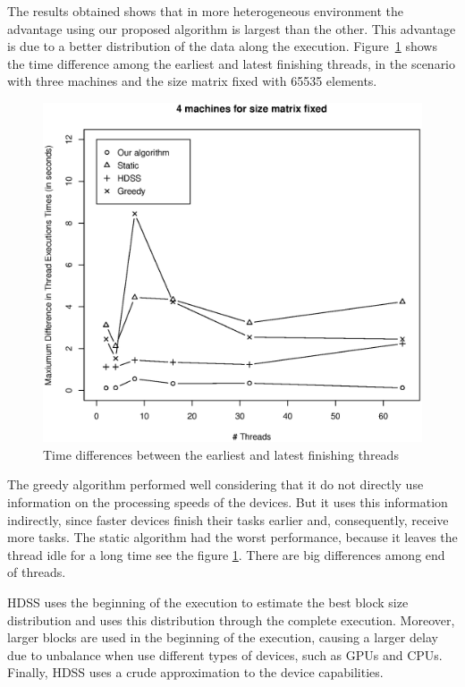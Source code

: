 \documentclass[journal]{IEEEtran}
\begin{document}
The results obtained shows that in more heterogeneous environment the advantage  using our proposed algorithm is largest than the other. This advantage is due to a better distribution of the data along the execution. Figure~\ref{fig:diferencaThreads} shows the time difference among the earliest and latest finishing threads, in the scenario with three machines and the size matrix fixed with 65535 elements. 

\begin{figure}[htb]
	\begin{center}
	\centering
			\includegraphics[scale=0.4]{Maxima_Diferenca_Matrix.eps}
	\caption{Time differences between the earliest and latest finishing threads}
	\label{fig:diferencaThreads}
	\end{center}
\end{figure}


The greedy algorithm performed well considering that it do not directly
use information on the processing speeds of the devices. But it uses this
information indirectly, since faster devices finish their tasks earlier and,
consequently, receive more tasks. The static algorithm had the worst performance, because it leaves the thread idle for a long time see the figure \ref{fig:diferencaThreads}. There are big differences among end of threads.

HDSS uses the beginning of the execution to estimate the best block size
distribution and uses this distribution through the complete
execution. Moreover, larger blocks are used in the beginning of the execution,
causing a larger delay due to unbalance when use different types of devices,
such as GPUs and CPUs. Finally, HDSS uses a crude approximation to the device
capabilities.
\end{document}
